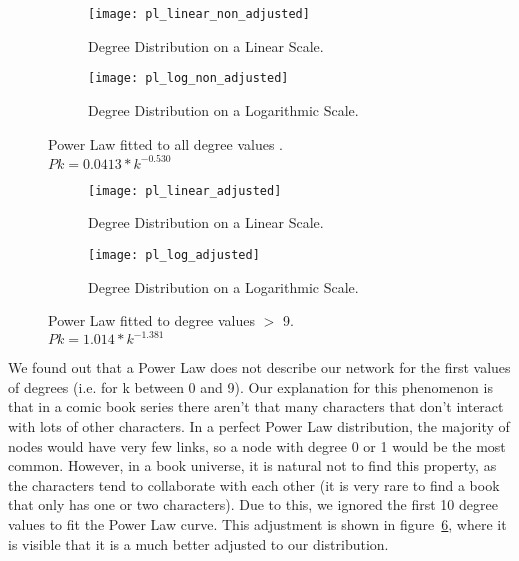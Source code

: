 \documentclass[a4paper]{article}
\begin{document}
\begin{figure}[h!]
\centering
\begin{subfigure}{.5\textwidth}
  \centering
  \texttt{[image: pl\_linear\_non\_adjusted]}
  \caption{Degree Distribution on a Linear Scale.}
  \label{fig:pl_linear_non_adjusted}
\end{subfigure}%
\begin{subfigure}[h!]{.5\textwidth}
  \centering
  \texttt{[image: pl\_log\_non\_adjusted]}
  \caption{Degree Distribution on a Logarithmic Scale.}
  \label{fig:pl_log_non_adjusted}
\end{subfigure}
\caption{Power Law fitted to all degree values .\\ $Pk =0.0413*k^{-0.530}$ }
\label{fig:pl_non_adjusted}
\end{figure}

\begin{figure}[h!]
\centering
\begin{subfigure}[h!]{.5\textwidth}
  \centering
  \texttt{[image: pl\_linear\_adjusted]}
  \caption{Degree Distribution on a Linear Scale.}
  \label{fig:pl_linear_adjusted}
\end{subfigure}%
\begin{subfigure}{.5\textwidth}
  \centering
  \texttt{[image: pl\_log\_adjusted]}
  \caption{Degree Distribution on a Logarithmic Scale.}
  \label{fig:pl_log_adjusted}
\end{subfigure}
\caption{Power Law fitted to degree values $>$ 9.\\  $Pk =1.014*k^{-1.381}$}
\label{fig:pl_adjusted}
\end{figure}

We found out that a Power Law does not describe our network for the first values of degrees (i.e. for k between 0 and 9). Our explanation for this phenomenon is that in a comic book series there aren't that many characters that don't interact with lots of other characters. In a perfect Power Law distribution, the majority of nodes would have very few links, so a node with degree 0 or 1 would be the most common. However, in a book universe, it is natural not to find this property, as the characters tend to collaborate with each other (it is very rare to find a book that only has one or two characters). 
Due to this, we ignored the first 10 degree values to fit the Power Law curve. This adjustment is shown in figure~\ref{fig:pl_adjusted}, where it is visible that it is a much better adjusted to our distribution.
\end{document}
